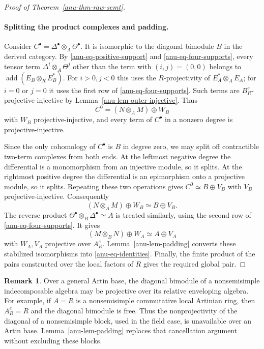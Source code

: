 \documentclass[12pt,a4paper,english,reqno]{amsart}
\numberwithin{equation}{section}
\theoremstyle{plain}
\theoremstyle{definition}
\newtheorem{remark}[theorem]{Remark}
\begin{document}
\begin{proof}[Proof of Theorem~\ref{anu-thm-raw-semt}]
\paragraph{Splitting the product complexes and padding.}
Consider $C^\bullet=\Delta^\bullet\otimes_A\Theta^\bullet$.
It is isomorphic to the diagonal bimodule $B$ in the derived category.
By \eqref{anu-eq-positive-support} and
\eqref{anu-eq-four-supports}, every tensor term
$\Delta^i\otimes_A\Theta^j$ other than the term with $(i,j)=(0,0)$
belongs to $\operatorname{add}(E_B\otimes_RE_B^*)$.
For $i>0,j<0$ this uses the $R$-projectivity of
$E_A^*\otimes_AE_A$; for $i=0$ or $j=0$ it uses the first row of
\eqref{anu-eq-four-supports}.
Such terms are $B_R^e$-projective-injective by
Lemma~\ref{anu-lem-outer-injective}.  Thus
\[
 C^0=(N\otimes_AM)\oplus W_B
\]
with $W_B$ projective-injective, and every term of $C^\bullet$
in a nonzero degree is projective-injective.

Since the only cohomology of $C^\bullet$ is $B$ in degree zero,
we may split off contractible two-term complexes from both ends.
At the leftmost negative degree the differential is a monomorphism
from an injective module, so it splits.  At the rightmost positive
degree the differential is an epimorphism onto a projective module,
so it splits.  Repeating these two operations gives
$C^0\simeq B\oplus V_B$ with $V_B$ projective-injective.
Consequently
\[
 (N\otimes_AM)\oplus W_B\simeq B\oplus V_B.
\]
The reverse product
$\Theta^\bullet\otimes_B\Delta^\bullet\simeq A$
is treated similarly, using the second row of
\eqref{anu-eq-four-supports}.  It gives
\[
 (M\otimes_BN)\oplus W_A\simeq A\oplus V_A
\]
with $W_A,V_A$ projective over $A_R^e$.
Lemma~\ref{anu-lem-padding} converts these stabilized
isomorphisms into \eqref{anu-eq-identities}.  Finally, the finite
product of the pairs constructed over the local factors of $R$
gives the required global pair.
\end{proof}

\begin{remark}\label{anu-rem-cancellation}
Over a general Artin base, the diagonal bimodule of a nonsemisimple
indecomposable algebra may be projective over its relative
enveloping algebra.  For example,
if $A=R$ is a nonsemisimple commutative local Artinian ring, then
$A_R^e=R$ and the diagonal bimodule is free.  Thus the nonprojectivity of the diagonal of a nonsemisimple block,
used in the field case, is unavailable over an Artin base.
Lemma~\ref{anu-lem-padding} replaces that cancellation argument
without excluding these blocks.
\end{remark}
\end{document}
